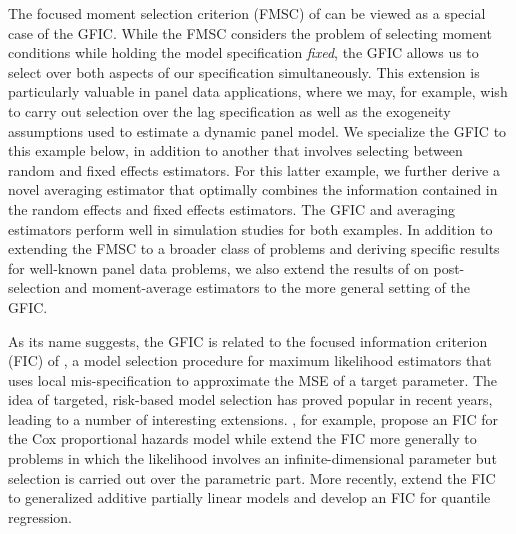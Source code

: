 The focused moment selection criterion (FMSC) of \cite{DiTraglia2016} can be viewed as a special case of the GFIC. 
While the FMSC considers the problem of selecting moment conditions while holding the model specification \emph{fixed}, the GFIC allows us to select over both aspects of our specification simultaneously.
This extension is particularly valuable in panel data applications, where we may, for example, wish to carry out selection over the lag specification as well as the exogeneity assumptions used to estimate a dynamic panel model.
We specialize the GFIC to this example below, in addition to another that involves selecting between random and fixed effects estimators.
For this latter example, we further derive a novel averaging estimator that optimally combines the information contained in the random effects and fixed effects estimators.
The GFIC and averaging estimators perform well in simulation studies for both examples.
In addition to extending the FMSC to a broader class of problems and deriving specific results for well-known panel data problems, we also extend the results of \cite{DiTraglia2016} on post-selection and moment-average estimators to the more general setting of the GFIC.  

As its name suggests, the GFIC is related to the focused information criterion (FIC) of \cite{ClaeskensHjort2003}, a model selection procedure for maximum likelihood estimators that uses local mis-specification to approximate the MSE of a target parameter. 
The idea of targeted, risk-based model selection has proved popular in recent years, leading to a number of interesting extensions. 
\cite{HjortClaeskens2006}, for example, propose an FIC for the Cox proportional hazards model while \cite{ClaeskensCarroll} extend the FIC more generally to problems in which the likelihood involves an infinite-dimensional parameter but selection is carried out over the parametric part. 
More recently, \cite{ZhangLiang} extend the FIC to generalized additive partially linear models and \cite{BehlClaeskensDette} develop an FIC for quantile regression.

